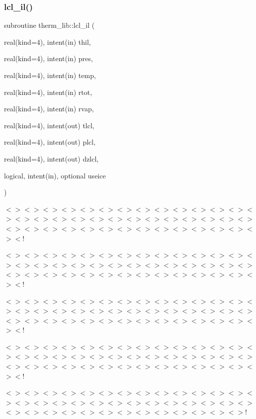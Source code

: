 \subsubsection{\texorpdfstring{lcl\+\_\+il()}{lcl\_il()}}
{\footnotesize\ttfamily subroutine therm\+\_\+lib\+::lcl\+\_\+il (\begin{DoxyParamCaption}\item[{real(kind=4), intent(in)}]{thil,  }\item[{real(kind=4), intent(in)}]{pres,  }\item[{real(kind=4), intent(in)}]{temp,  }\item[{real(kind=4), intent(in)}]{rtot,  }\item[{real(kind=4), intent(in)}]{rvap,  }\item[{real(kind=4), intent(out)}]{tlcl,  }\item[{real(kind=4), intent(out)}]{plcl,  }\item[{real(kind=4), intent(out)}]{dzlcl,  }\item[{logical, intent(in), optional}]{useice }\end{DoxyParamCaption})}

$<$$>$$<$$>$$<$$>$$<$$>$$<$$>$$<$$>$$<$$>$$<$$>$$<$$>$$<$$>$$<$$>$$<$$>$$<$$>$$<$$>$$<$$>$$<$$>$$<$$>$$<$$>$$<$$>$$<$$>$$<$$>$$<$$>$$<$$>$$<$$>$$<$$>$$<$$>$$<$$>$$<$$>$$<$$>$$<$$>$$<$$>$$<$$>$$<$$>$$<$$>$$<$$>$$<$$>$$<$$>$$<$$>$$<$$>$$<$$>$$<$$>$$<$!

$<$$>$$<$$>$$<$$>$$<$$>$$<$$>$$<$$>$$<$$>$$<$$>$$<$$>$$<$$>$$<$$>$$<$$>$$<$$>$$<$$>$$<$$>$$<$$>$$<$$>$$<$$>$$<$$>$$<$$>$$<$$>$$<$$>$$<$$>$$<$$>$$<$$>$$<$$>$$<$$>$$<$$>$$<$$>$$<$$>$$<$$>$$<$$>$$<$$>$$<$$>$$<$$>$$<$$>$$<$$>$$<$$>$$<$$>$$<$$>$$<$$>$$<$!

$<$$>$$<$$>$$<$$>$$<$$>$$<$$>$$<$$>$$<$$>$$<$$>$$<$$>$$<$$>$$<$$>$$<$$>$$<$$>$$<$$>$$<$$>$$<$$>$$<$$>$$<$$>$$<$$>$$<$$>$$<$$>$$<$$>$$<$$>$$<$$>$$<$$>$$<$$>$$<$$>$$<$$>$$<$$>$$<$$>$$<$$>$$<$$>$$<$$>$$<$$>$$<$$>$$<$$>$$<$$>$$<$$>$$<$$>$$<$$>$$<$$>$$<$!

$<$$>$$<$$>$$<$$>$$<$$>$$<$$>$$<$$>$$<$$>$$<$$>$$<$$>$$<$$>$$<$$>$$<$$>$$<$$>$$<$$>$$<$$>$$<$$>$$<$$>$$<$$>$$<$$>$$<$$>$$<$$>$$<$$>$$<$$>$$<$$>$$<$$>$$<$$>$$<$$>$$<$$>$$<$$>$$<$$>$$<$$>$$<$$>$$<$$>$$<$$>$$<$$>$$<$$>$$<$$>$$<$$>$$<$$>$$<$$>$$<$$>$$<$!

$<$$>$$<$$>$$<$$>$$<$$>$$<$$>$$<$$>$$<$$>$$<$$>$$<$$>$$<$$>$$<$$>$$<$$>$$<$$>$$<$$>$$<$$>$$<$$>$$<$$>$$<$$>$$<$$>$$<$$>$$<$$>$$<$$>$$<$$>$$<$$>$$<$$>$$<$$>$$<$$>$$<$$>$$<$$>$$<$$>$$<$$>$$<$$>$$<$$>$$<$$>$$<$$>$$<$$>$$<$$>$$<$$>$$<$$>$$<$$>$!

